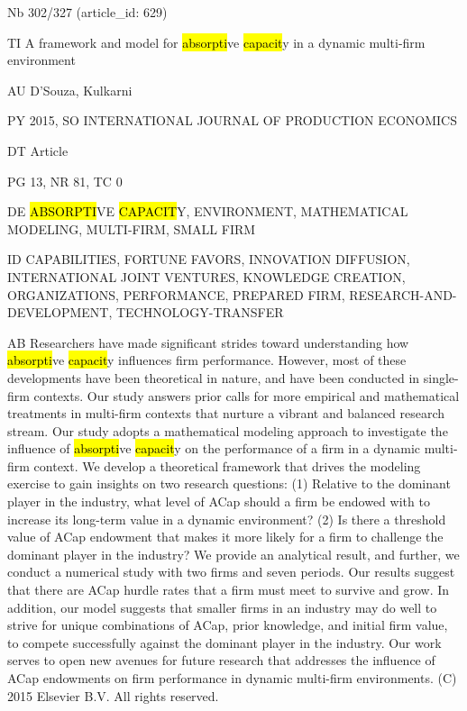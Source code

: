 \documentclass[a4paper]{article}
\begin{document}
\vspace*{-2cm}
Nb \tabto{0cm}302/327 (article\_id: 629)\par
TI \tabto{0cm}A framework and model for \hl{absorpti}ve \hl{capacit}y in a dynamic multi-firm environment\par
AU \tabto{0cm}D'Souza, Kulkarni\par
PY \tabto{0cm}2015, SO INTERNATIONAL JOURNAL OF PRODUCTION ECONOMICS\par
DT \tabto{0cm}Article\par
PG \tabto{0cm}13, NR 81, TC 0\par
DE \tabto{0cm}\hl{ABSORPTI}VE \hl{CAPACIT}Y, ENVIRONMENT, MATHEMATICAL MODELING, MULTI-FIRM, SMALL FIRM\par
ID \tabto{0cm}CAPABILITIES, FORTUNE FAVORS, INNOVATION DIFFUSION, INTERNATIONAL JOINT VENTURES, KNOWLEDGE CREATION, ORGANIZATIONS, PERFORMANCE, PREPARED FIRM, RESEARCH-AND-DEVELOPMENT, TECHNOLOGY-TRANSFER\par
AB \tabto{0cm}Researchers have made significant strides toward understanding how \hl{absorpti}ve \hl{capacit}y influences firm performance. However, most of these developments have been theoretical in nature, and have been conducted in single-firm contexts. Our study answers prior calls for more empirical and mathematical treatments in multi-firm contexts that nurture a vibrant and balanced research stream. Our study adopts a mathematical modeling approach to investigate the influence of \hl{absorpti}ve \hl{capacit}y on the performance of a firm in a dynamic multi-firm context. We develop a theoretical framework that drives the modeling exercise to gain insights on two research questions: (1) Relative to the dominant player in the industry, what level of ACap should a firm be endowed with to increase its long-term value in a dynamic environment? (2) Is there a threshold value of ACap endowment that makes it more likely for a firm to challenge the dominant player in the industry? We provide an analytical result, and further, we conduct a numerical study with two firms and seven periods. Our results suggest that there are ACap hurdle rates that a firm must meet to survive and grow. In addition, our model suggests that smaller firms in an industry may do well to strive for unique combinations of ACap, prior knowledge, and initial firm value, to compete successfully against the dominant player in the industry. Our work serves to open new avenues for future research that addresses the influence of ACap endowments on firm performance in dynamic multi-firm environments. (C) 2015 Elsevier B.V. All rights reserved.\par
\clearpage
\end{document}
